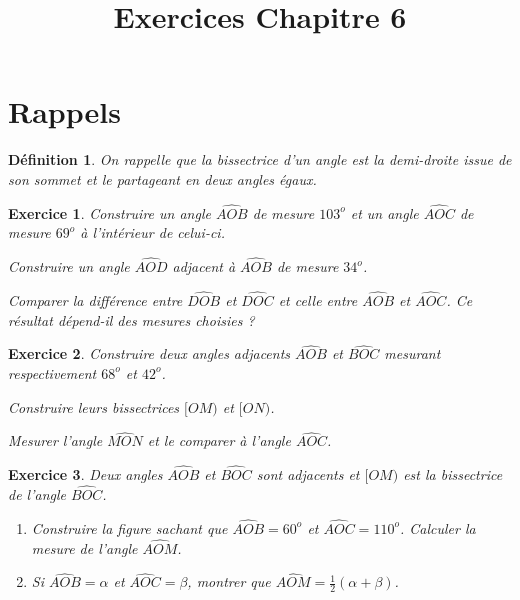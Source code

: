 \documentclass[12 pt]{article}
\title{Exercices Chapitre 6}
\date{}
\theoremstyle{plain}
\newcounter{n}
\numberwithin{n}{section}
\newtheorem*{df}{Définition}
\newtheorem{exo}{Exercice}
\begin{document}
\section{Rappels }
\begin{df}On rappelle que la \emph{bissectrice} d'un angle est la demi-droite issue de son sommet et le partageant en deux angles égaux. \end{df}

\begin{exo}
Construire un angle $\widehat{AOB}$ de mesure $103^o$ et un angle $\widehat{AOC}$ de mesure $69^o$ à l'intérieur de celui-ci. 

Construire un angle $\widehat{AOD}$ adjacent à $\widehat{AOB}$ de mesure $34^o$. 

Comparer la différence entre $\widehat{DOB}$ et $\widehat{DOC}$ et celle entre $\widehat{AOB}$ et $\widehat{AOC}$. Ce résultat dépend-il des mesures choisies ?

\end{exo}
\begin{exo}
Construire deux angles adjacents $\widehat{AOB}$ et $\widehat{BOC}$ mesurant respectivement $68^o$ et $42^o$.

Construire leurs bissectrices $[OM)$ et $[ON)$. 

Mesurer l'angle $\widehat{MON}$ et le comparer à l'angle $\widehat{AOC}$. 
\end{exo}

\begin{exo}Deux angles $\widehat{AOB}$ et $\widehat{BOC}$ sont adjacents 
et $[OM)$ est la bissectrice de l'angle $\widehat{BOC}$. \begin{enumerate}
\item Construire la figure sachant que $\widehat{AOB}=60^o$ et $\widehat{AOC}= 110^o$. Calculer la mesure de l'angle $\widehat{AOM}$. 
\item Si $\widehat{AOB}= \alpha$ et $\widehat{AOC}= \beta$, montrer que $\widehat{AOM}= \frac12(\alpha + \beta)$. 
\end{enumerate}
\end{exo}
\end{document}
